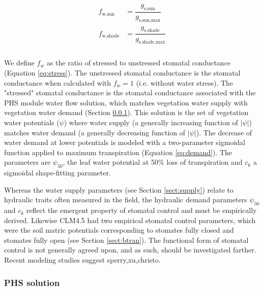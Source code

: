 \documentclass[draft,linenumbers]{agujournal}
\begin{document}
    
     \begin{linenomath*}
     \begin{eqnarray}
     \begin{aligned}
     \label{eq:stress}
     f_{\text{w,sun}}         &= \dfrac{g_{\text{s,sun}}}{g_{\text{s,sun,max}}} \\
     f_{\text{w,shade}}     &= \dfrac{g_{\text{s,shade}}}{g_{\text{s,shade,max}}} \\
     \end{aligned}
     \end{eqnarray}
     \end{linenomath*}
    

     
    We define $f_w$ as the ratio of stressed to unstressed stomatal conductance (Equation \ref{eq:stress}).
    The unstressed stomatal conductance is the stomatal conductance when calculated with $f_w=1$
    (i.e. without water stress). 
    The "stressed" stomatal conductance is the stomatal conductance associated with the PHS module
    water flow solution, which matches vegetation water supply with vegetation water demand 
    (Section \ref{sect:solution}).
    This solution is the set of vegetation water potentials ($\psi$) where water supply
    (a generally increasing function of $\left|\psi\right|$) matches water demand
    (a generally decreasing function of $\left|\psi\right|$).
    The decrease of water demand at lower potentials is modeled with a two-parameter sigmoidal function 
     applied to maximum transpiration (Equation \ref{eq:demand}). 
     The parameters are $\psi_{50}$, the leaf water potential at 50\% loss of transpiration and 
     $c_k$ a sigmoidal shape-fitting parameter.
     
     Whereas the water supply parameters (see Section \ref{sect:supply}) 
     relate to hydraulic traits often measured in the field, 
     the hydraulic demand parameters $\psi_{50}$ and $c_k$ reflect the emergent property of stomatal control
     and must be empirically derived. 
     Likewise CLM4.5 had two empirical stomatal control parameters, which were the soil matric potentials 
     corresponding to stomates fully closed and stomates fully open (see Section \ref{sect:btran}).
     The functional form of stomatal control is not generally agreed upon, and as such, 
     should be investigated farther. Recent modeling studies suggest sperry,xu,christo.

    \subsubsection{PHS solution}
    \label{sect:solution}
    
\end{document}
